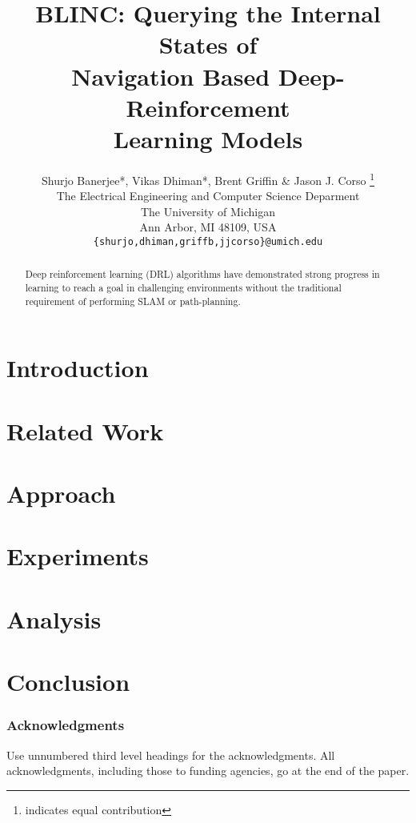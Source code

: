 \documentclass{article} %
\title{BLINC: Querying the Internal States of \\Navigation Based Deep-Reinforcement \\Learning Models}
\author{Shurjo Banerjee*, Vikas Dhiman*, Brent Griffin \& Jason J. Corso \thanks{indicates equal contribution} \\
The Electrical Engineering and Computer Science Deparment\\
The University of Michigan\\
Ann Arbor, MI 48109, USA \\
\texttt{\{shurjo,dhiman,griffb,jjcorso\}@umich.edu} \\
}
\begin{document}
\maketitle

\begin{abstract}
Deep reinforcement learning (DRL) algorithms have demonstrated strong progress in learning to reach a goal in challenging environments without the traditional requirement of performing SLAM or path-planning. 

\end{abstract}

\section{Introduction}


\section{Related Work}



\section{Approach}


\section{Experiments}


\section{Analysis}


\section{Conclusion}



\subsubsection*{Acknowledgments}

Use unnumbered third level headings for the acknowledgments. All
acknowledgments, including those to funding agencies, go at the end of the paper.




\end{document}
